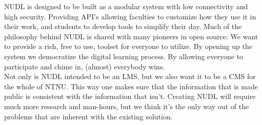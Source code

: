 \noindent
NUDL is designed to be built as a modular system with low connectivity and high security. Providing API's allowing faculties to customize how they use it in their work, and students to develop tools to simplify their day. Much of the philosophy behind NUDL is shared with many pioneers in open source: We want to provide a rich, free to use, toolset for everyone to utilize. By opening up the system we democratize the digital learning process. By allowing everyone to participate and chime in, (almost) everybody wins. \\

\noindent
Not only is NUDL intended to be an LMS, but we also want it to be a CMS for the whole of NTNU. This way one makes sure that the information that is made public is consistent with the information that isn't. Creating NUDL will require much more research and man-hours, but we think it's the only way out of the problems that are inherent with the existing solution.